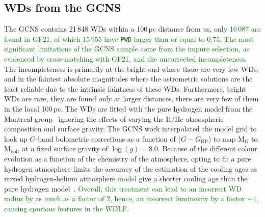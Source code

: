 \documentclass[fleqn,usenatbib]{mnras}
\begin{document}
\subsection{WDs from the GCNS}
The GCNS contains 21\,848 WDs within a 100\,pc distance from us, only
\textcolor{green}{16\,087 are found in GF21, of which 15\,955 have \texttt{PWD} 
larger than or equal to 0.75. The most significant limitations of the GCNS 
sample come from the impure selection, as evidenced by cross-matching with GF21,
and the uncorrected incompleteness.} The incompleteness is primarily at the
bright end where there are very few WDs, and in the faintest absolute magnitudes
where the astrometric solutions are the least reliable due to the intrinsic
faintness of these WDs. Furthermore, bright WDs are rare, they are found only at
larger distances, there are very few of them in the local 100\,pc. The WDs are
fitted with the pure hydrogen model from the Montreal
group~\citep{2019ApJ...876...67B} ignoring the effects of varying
the H/He atmospheric composition and surface gravity. The GCNS work
interpolated the model grid to look up $G$-band bolometric corrections as a
function of ($G - G_{\mathrm{RP}}$) to map M$_\mathrm{G}$ to M$_{\mathrm{bol}}$,
at a fixed surface gravity of $\log(g)=8.0$. Because of the different colour
evolution as a function of the chemistry of the atmosphere, opting to fit a
pure hydrogen atmosphere limits the accuracy of the estimation of the cooling
ages as mixed hydrogen-helium atmosphere \textcolor{green}{model} give a
shorter cooling age than the pure hydrogen model~\citep{2022ApJ...934...36B}.
\textcolor{green}{Overall, this treatment can lead to an incorrect WD radius
by as much as a factor of 2, hence, an incorrect luminosity by a factor
$\sim$$4$, causing spurious features in the WDLF.}
\end{document}
